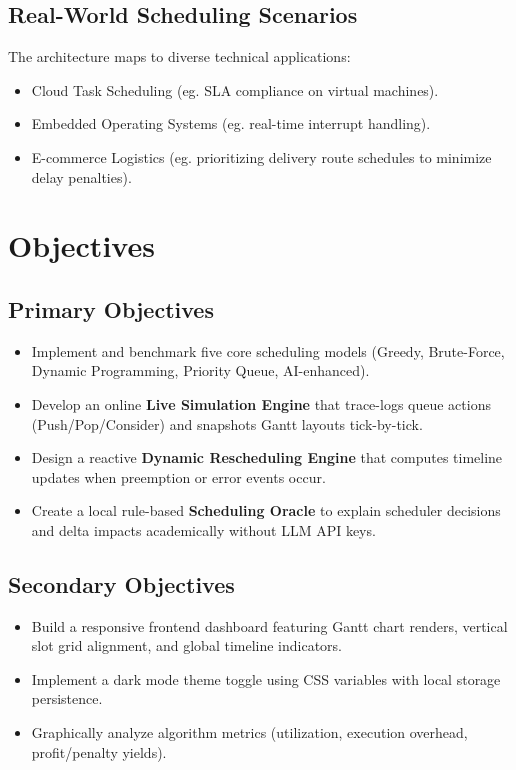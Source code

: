 \documentclass[12pt,a4paper]{article}
\begin{document}
\subsection{Real-World Scheduling Scenarios}
The architecture maps to diverse technical applications:
\begin{itemize}
    \item Cloud Task Scheduling (eg. SLA compliance on virtual machines).
    \item Embedded Operating Systems (eg. real-time interrupt handling).
    \item E-commerce Logistics (eg. prioritizing delivery route schedules to minimize delay penalties).
\end{itemize}


\section{Objectives}

\subsection{Primary Objectives}
\begin{itemize}
    \item Implement and benchmark five core scheduling models (Greedy, Brute-Force, Dynamic Programming, Priority Queue, AI-enhanced).
    \item Develop an online \textbf{Live Simulation Engine} that trace-logs queue actions (Push/Pop/Consider) and snapshots Gantt layouts tick-by-tick.
    \item Design a reactive \textbf{Dynamic Rescheduling Engine} that computes timeline updates when preemption or error events occur.
    \item Create a local rule-based \textbf{Scheduling Oracle} to explain scheduler decisions and delta impacts academically without LLM API keys.
\end{itemize}

\subsection{Secondary Objectives}
\begin{itemize}
    \item Build a responsive frontend dashboard featuring Gantt chart renders, vertical slot grid alignment, and global timeline indicators.
    \item Implement a dark mode theme toggle using CSS variables with local storage persistence.
    \item Graphically analyze algorithm metrics (utilization, execution overhead, profit/penalty yields).
\end{itemize}
\end{document}
